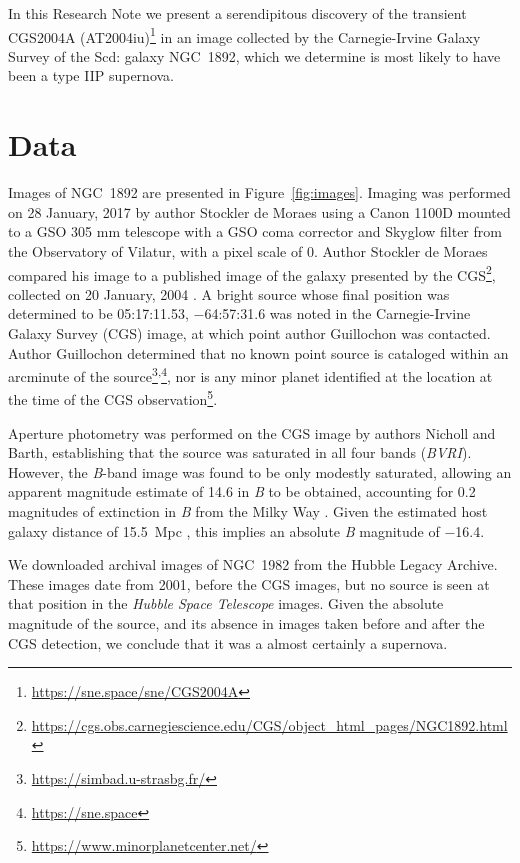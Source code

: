\documentclass[RNAAS]{aastex62}
\begin{document}
\begin{CJK*}{UTF8}{gbsn}
In this Research Note we present a serendipitous discovery of the transient CGS2004A (AT2004iu)\footnote{\url{https://sne.space/sne/CGS2004A}} in an image collected by the Carnegie-Irvine Galaxy Survey of the Scd: \citep{deVaucouleurs:1991a} galaxy NGC~1892, which we determine is most likely to have been a type IIP supernova.

\section{Data}

Images of NGC~1892 are presented in Figure~\ref{fig:images}. Imaging was performed on 28 January, 2017 by author Stockler de Moraes using a Canon 1100D mounted to a GSO 305 mm telescope with a GSO coma corrector and Skyglow filter from the Observatory of Vilatur, with a pixel scale of 0. Author Stockler de Moraes compared his image to a published image of the galaxy presented by the CGS\footnote{\url{https://cgs.obs.carnegiescience.edu/CGS/object_html_pages/NGC1892.html}}, collected on 20 January, 2004 \citep{Ho:2011a}. A bright source whose final position was determined to be 05:17:11.53, $-$64:57:31.6 was noted in the Carnegie-Irvine Galaxy Survey (CGS) image, at which point author Guillochon was contacted. Author Guillochon determined that no known point source is cataloged within an arcminute of the source\footnote{\url{https://simbad.u-strasbg.fr/}}\textsuperscript{,}\footnote{\url{https://sne.space}}, nor is any minor planet identified at the location at the time of the CGS observation\footnote{\url{https://www.minorplanetcenter.net/}}.

Aperture photometry was performed on the CGS image by authors Nicholl and Barth, establishing that the source was saturated in all four bands (\emph{BVRI}). However, the \emph{B}-band image was found to be only modestly saturated, allowing an apparent magnitude estimate of 14.6 in \emph{B} to be obtained, accounting for 0.2 magnitudes of extinction in \emph{B} from the Milky Way \citep[14.8 without extinction,][]{Schlafly:2011a}. Given the estimated host galaxy distance of 15.5~Mpc \citep{Helou:1991a}, this implies an absolute \emph{B} magnitude of $-$16.4.

We downloaded archival images of NGC~1982 from the Hubble Legacy Archive. These images date from 2001, before the CGS images, but no source is seen at that position in the \textit{Hubble Space Telescope} images.
Given the absolute magnitude of the source, and its absence in images taken before and after the CGS detection, we conclude that it was a almost certainly a supernova.


\end{CJK*}
\end{document}
